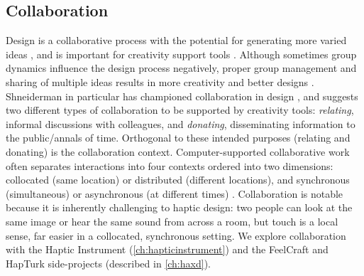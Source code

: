 \subsection{Collaboration}
Design is a collaborative process with the potential for generating more varied ideas \cite{Warr2005}, and is important for creativity support tools \cite{Resnick2008,Shneiderman2000}.
Although sometimes group dynamics influence the design process negatively, proper group management and sharing of multiple ideas results in more creativity and better designs \cite{Herring2009}.
Shneiderman in particular has championed collaboration in design \cite{Shneiderman2000}, and suggests two different types of collaboration to be supported by creativity tools: \emph{relating}, informal discussions with colleagues, and \emph{donating}, disseminating information to the public/annals of time.
Orthogonal to these intended purposes (relating and donating) is the collaboration context.
Computer-supported collaborative work often separates interactions into four contexts ordered into two dimensions: collocated (same location) or distributed (different locations), and synchronous (simultaneous)  or asynchronous (at different times) \cite{Ellis1991}.
Collaboration is notable because it is inherently challenging to haptic design: two people can look at the same image or hear the same sound from across a room, but touch is a local sense, far easier in a collocated, synchronous setting.
We explore collaboration with the Haptic Instrument (\autoref{ch:hapticinstrument}) and the FeelCraft and HapTurk side-projects (described in \autoref{ch:haxd}).





